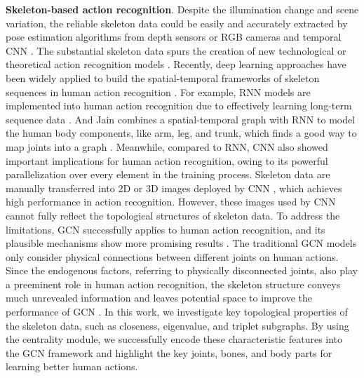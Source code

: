 \documentclass[runningheads]{llncs}
\begin{document}
\textbf{Skeleton-based action recognition}.  Despite the illumination change and scene variation, the reliable skeleton data could be easily and accurately extracted by pose estimation algorithms from depth sensors \cite{shotton2011real} or RGB cameras \cite{Shahroudy_2016_NTURGBD,isola2017image,xiu2018pose} and temporal CNN \cite{li2017person}. The substantial skeleton data spurs the creation of new technological or theoretical action recognition models \cite{carreira2017quo,stergiou2020learning,wang2016temporal}. Recently, deep learning approaches have been widely applied to build the spatial-temporal frameworks of skeleton sequences in human action recognition \cite{rahmani2017learning,liu2016spatio}. For example, RNN models are implemented into human action recognition due to effectively learning long-term sequence data \cite{li2017adaptive,shi2017learning}. And Jain combines a spatial-temporal graph with RNN to model the human body components, like arm, leg, and trunk, which finds a good way to map joints into a graph \cite{jain2016structural}. Meanwhile, compared to RNN, CNN also showed important implications for human action recognition, owing to its powerful parallelization over every element in the training process. Skeleton data are manually transferred into 2D or 3D images deployed by CNN \cite{li2017demystifying}, which achieves high performance in action recognition. However, these images used by CNN cannot fully reflect the topological structures of skeleton data. To address the limitations, GCN successfully applies to human action recognition, and its plausible mechanisms show more promising results \cite{yan2018spatial}. The traditional GCN models only consider physical connections between different joints on human actions. Since the endogenous factors, referring to physically disconnected joints, also play a preeminent role in human action recognition, the skeleton structure conveys much unrevealed information and leaves potential space to improve the performance of GCN \cite{weng2017spatio}. In this work, we investigate key topological properties of the skeleton data, such as closeness, eigenvalue, and triplet subgraphs. By using the centrality module, we successfully encode these characteristic features into the GCN framework and highlight the key joints, bones, and body parts for learning better human actions.
\end{document}
